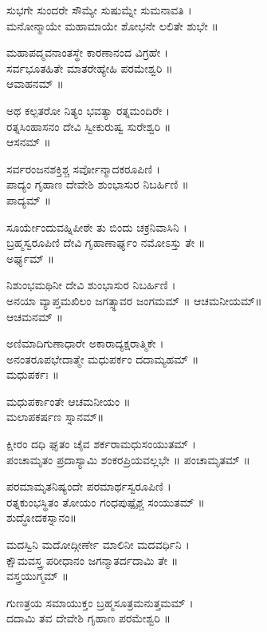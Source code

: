 ಸುಭಗೇ ಸುಂದರೇ ಸೌಮ್ಯೇ ಸುಷುಮ್ನೇ ಸುಮನಾವತಿ ।\\
ಮನೋನ್ಮಾಯೇ ಮಹಾಮಾಯೇ ಶೋಭನೇ ಲಲಿತೇ ಶುಭೇ ॥

ಮಹಾಪದ್ಮವನಾಂತಸ್ಥೇ ಕಾರಣಾನಂದ ವಿಗ್ರಹೇ ।\\
ಸರ್ವಭೂತಹಿತೇ ಮಾತರೇಹ್ಯೇಹಿ ಪರಮೇಶ್ವರಿ ॥\\
 ಆವಾಹನಮ್ ॥

ಅಥ ಕಲ್ಪತರೋ ನಿತ್ಯಂ ಭವತ್ಯಾ ರತ್ನಮಂದಿರೇ ।\\
ರತ್ನಸಿಂಹಾಸನಂ ದೇವಿ ಸ್ವೀಕುರುಷ್ವ ಸುರೇಶ್ವರಿ ॥\\
ಆಸನಮ್ ॥

ಸರ್ವರಂಜನಶಕ್ತಿಶ್ಚ ಸರ್ವೋನ್ಮಾದಕರೂಪಿಣಿ ।\\
ಪಾದ್ಯಂ ಗೃಹಾಣ ದೇವೇಶಿ ಶುಂಭಾಸುರ ನಿಬರ್ಹಿಣಿ ॥\\
ಪಾದ್ಯಮ್ ॥


ಸೂರ್ಯೇಂದುವಹ್ನಿಪೀಠೇ ತು ಬಿಂದು ಚಕ್ರನಿವಾಸಿನಿ ।\\
ಬ್ರಹ್ಮಸ್ವರೂಪಿಣಿ ದೇವಿ ಗೃಹಾಣಾರ್ಘ್ಯಂ ನಮೋಽಸ್ತು ತೇ ॥\\
 ಅರ್ಘ್ಯಮ್ ॥


ನಿಶುಂಭಮಥಿನೀ ದೇವಿ ಶುಂಭಾಸುರ ನಿಬರ್ಹಿಣಿ ।\\
ಅನಯಾ ವ್ಯಾಪ್ತಮಖಿಲಂ ಜಗತ್ಸ್ಥಾವರ ಜಂಗಮಮ್ ॥ ಆಚಮನೀಯಮ್॥\\
 ಆಚಮನಮ್ ॥


ಅಣಿಮಾದಿಗುಣಾಧಾರೇ ಅಕಾರಾದ್ಯಕ್ಷರಾತ್ಮಿಕೇ ।\\
ಅನಂತರೂಪಭೇದಾತ್ಮೇ ಮಧುಪರ್ಕಂ ದದಾಮ್ಯಹಮ್ ॥\\
 ಮಧುಪರ್ಕಃ ॥

ಮಧುಪರ್ಕಾಂತೇ ಆಚಮನೀಯಂ ॥\\
ಮಲಾಪಕರ್ಷಣ ಸ್ನಾನಮ್॥

ಕ್ಷೀರಂ ದಧಿ ಘೃತಂ ಚೈವ ಶರ್ಕರಾಮಧುಸಂಯುತಮ್ ।\\
ಪಂಚಾಮೃತಂ ಪ್ರದಾಸ್ಯಾಮಿ ಶಂಕರಪ್ರಿಯವಲ್ಲಭೇ ॥ ಪಂಚಾಮೃತಮ್ ॥

ಪರಮಾಮೃತನಿಷ್ಯಂದೇ ಪರಮಾರ್ಥಸ್ವರೂಪಿಣಿ ।\\
ರತ್ನಕುಂಭಸ್ಥಿತಂ ತೋಯಂ ಗಂಧಪುಷ್ಪೈಶ್ಚ ಸಂಯುತಮ್ ॥\\
ಶುದ್ಧೋದಕಸ್ನಾನಂ॥

ಮದಸ್ವಿನಿ ಮದೋದ್ಗೀರ್ಣೇ ಮಾಲಿನೀ ಮದವರ್ಧಿನಿ ।\\
ಕ್ಷೌಮವಸ್ತ್ರ ಪರೀಧಾನಂ ಜಗನ್ಮಾತರ್ದದಾಮಿ ತೇ ॥\\
ವಸ್ತ್ರಯುಗ್ಮಮ್ ॥

ಗುಣತ್ರಯ ಸಮಾಯುಕ್ತಂ ಬ್ರಹ್ಮಸೂತ್ರಮನುತ್ತಮಮ್ ।\\
ದದಾಮಿ ತವ ದೇವೇಶಿ ಗೃಹಾಣ ಪರಮೇಶ್ವರಿ ॥

